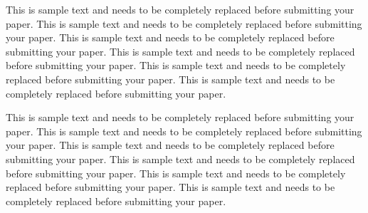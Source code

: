 \documentclass[11pt]{asaproc}
\begin{document}
This is sample text and needs to be completely replaced before submitting your paper. This is sample text and needs to be completely replaced before submitting your paper. This is sample text and needs to be completely replaced before submitting your paper. This is sample text and needs to be completely replaced before submitting your paper. This is sample text and needs to be completely replaced before submitting your paper. This is sample text and needs to be completely replaced before submitting your paper.

This is sample text and needs to be completely replaced before submitting your paper. This is sample text and needs to be completely replaced before submitting your paper. This is sample text and needs to be completely replaced before submitting your paper. This is sample text and needs to be completely replaced before submitting your paper. This is sample text and needs to be completely replaced before submitting your paper. This is sample text and needs to be completely replaced before submitting your paper.

\end{document}
